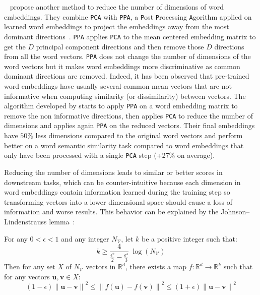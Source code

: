     \citeauthor{raunak2019effective}~\citep{raunak2019effective} propose another
    method to reduce the number of dimensions of word embeddings. They combine
    \texttt{PCA} with \texttt{PPA}, a \texttt{P}ost \texttt{P}rocessing
    \texttt{A}gorithm applied on learned word embeddings to project the
    embeddings away from the most dominant directions~\citep{mu2018all}.
    \texttt{PPA} applies \texttt{PCA} to the mean centered embedding matrix to
    get the $D$ principal component directions and then remove those $D$
    directions from all the word vectors. \texttt{PPA} does not change the
    number of dimensions of the word vectors but it makes word embeddings more
    discriminative as common dominant directions are removed. Indeed, it has
    been observed that pre-trained word embeddings have usually several common
    mean vectors that are not informative when computing similarity (or
    dissimilarity) between vectors. The algorithm developed by
    \citeauthor{raunak2019effective} starts to apply \texttt{PPA} on a word
    embedding matrix to remove the non informative directions, then applies
    \texttt{PCA} to reduce the number of dimensions and applies again
    \texttt{PPA} on the reduced vectors. Their final embeddings have $50\%$ less
    dimensions compared to the original word vectors and perform better on a
    word semantic similarity task compared to word embeddings that only have
    been processed with a single \texttt{PCA} step (+27\% on average).\medskip

    Reducing the number of dimensions leads to similar or better scores in
    downstream tasks, which can be counter-intuitive because each dimension in
    word embeddings contain information learned during the training step so
    transforming vectors into a lower dimensional space should cause a loss of
    information and worse results. This behavior can be explained by the
    Johnson–Lindenstrauss lemma~\citep{johnson1984extensions}:

    \begin{lemma}
      For any $0 < \epsilon < 1$ and any integer $N_\mathcal{V}$, let $k$ be a
      positive integer such that:
      \begin{equation}
        k \geq \frac{4}{\frac{\epsilon^2}{2} - \frac{\epsilon^3}{3}}
        ~\log(N_\mathcal{V})
      \end{equation}
      Then for any set $X$ of $N_\mathcal{V}$ vectors in $\mathbb{R}^d$, there
      exists a map $f: \mathbb{R}^d \to \mathbb{R}^{k}$ such that for any
      vectors $\mathbf{u}, \mathbf{v} \in X$:
      \begin{equation}
        (1 - \epsilon)\left\lVert \mathbf{u} - \mathbf{v} \right\rVert^2 \leq
        \left\lVert f(\mathbf{u}) - f(\mathbf{v}) \right\rVert^2 \leq
        (1 + \epsilon)\left\lVert \mathbf{u} - \mathbf{v} \right\rVert^2
      \end{equation}
    \end{lemma}

